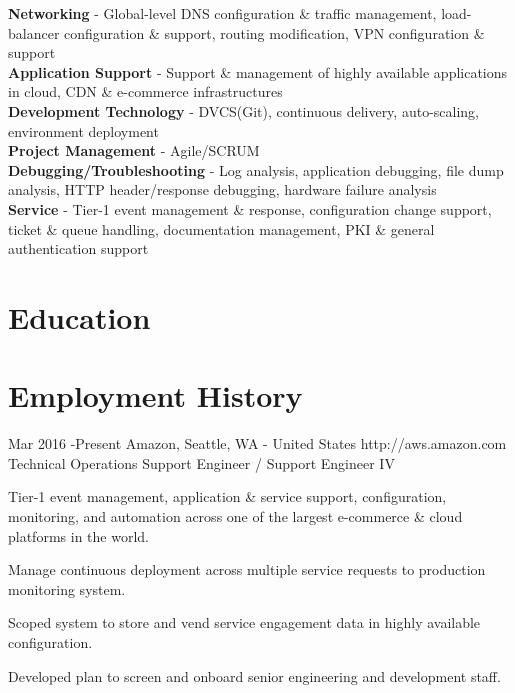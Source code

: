 \documentclass[10pt]{article} %
\begin{document}

{
\textbf{Networking} - Global-level DNS configuration \& traffic management, load-balancer configuration \& support, routing modification, VPN configuration \& support  \\
\textbf{Application Support} - Support \& management of highly available applications in cloud, CDN \& e-commerce infrastructures\\
\textbf{Development Technology} - DVCS(Git), continuous delivery, auto-scaling, environment deployment\\
\textbf{Project Management} - Agile/SCRUM\\
\textbf{Debugging/Troubleshooting} - Log analysis, application debugging, file dump analysis, HTTP header/response debugging, hardware failure analysis \\
\textbf{Service} - Tier-1 event management \& response, configuration change support, ticket \& queue handling, documentation management, PKI \& general authentication support
}


\section{Education}



\section{Employment History}
	
\job
{Mar 2016 -}{Present}
{Amazon, Seattle, WA - United States}
{http://aws.amazon.com}
{Technical Operations Support Engineer / Support Engineer IV}
{
\begin{itemize-noindent}
\item{Tier-1 event management, application \& service support, configuration, monitoring, and automation across one of the largest e-commerce \& cloud platforms in the world.}
\item{Manage continuous deployment across multiple service requests to production monitoring system.}
\item{Scoped system to store and vend service engagement data in highly available configuration.}
\item{Developed plan to screen and onboard senior engineering and development staff.}
\end{itemize-noindent}

}
\end{document}
